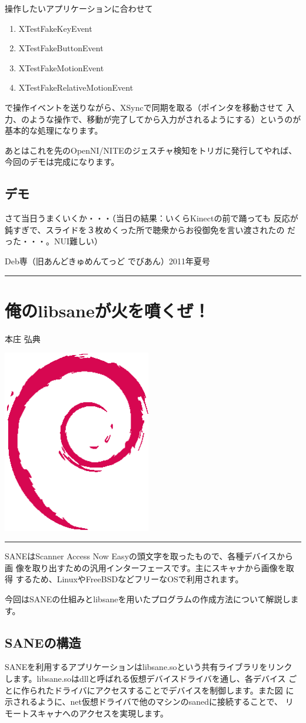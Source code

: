 \documentclass[mingoth,a4paper]{jsarticle}
\renewcommand{\dancersection}[2]{%
\newpage
Deb専（旧あんどきゅめんてっど でびあん）2011年夏号
%
\vspace{0.1mm}\\
{\color{dancerdarkblue}\rule{\hsize}{2mm}}

%
%
\begin{minipage}[t]{0.6\hsize}
\color{dancerdarkblue}
\vspace{1cm}
\section{#1}
\hfill{}#2\\
\end{minipage}
\begin{minipage}[t]{0.4\hsize}
\vspace{-2cm}
\hfill{}\includegraphics[height=8cm]{image200502/openlogo-nd.eps}\\
\vspace{-5cm}
\end{minipage}
%
{\color{dancerlightblue}\rule{0.66\hsize}{2mm}}
%
\vspace{2cm}
}
\begin{document}
操作したいアプリケーションに合わせて
\begin{enumerate}
\item XTestFakeKeyEvent
\item XTestFakeButtonEvent
\item XTestFakeMotionEvent
\item XTestFakeRelativeMotionEvent
\end{enumerate}
で操作イベントを送りながら、XSyncで同期を取る（ポインタを移動させて
入力、のような操作で、移動が完了してから入力がされるようにする）というのが
基本的な処理になります。

あとはこれを先のOpenNI/NITEのジェスチャ検知をトリガに発行してやれば、
今回のデモは完成になります。

\subsection{デモ}
さて当日うまくいくか・・・（当日の結果：いくらKinectの前で踊っても
反応が鈍すぎで、スライドを３枚めくった所で聴衆からお役御免を言い渡されたの
だった・・・。NUI難しい）

\dancersection{俺のlibsaneが火を噴くぜ！}{本庄 弘典}

SANEはScanner Access Now Easyの頭文字を取ったもので、各種デバイスから画
像を取り出すための汎用インターフェースです。主にスキャナから画像を取得
するため、LinuxやFreeBSDなどフリーなOSで利用されます。

今回はSANEの仕組みとlibsaneを用いたプログラムの作成方法について解説します。

\subsection{SANEの構造}

SANEを利用するアプリケーションはlibsane.soという共有ライブラリをリンク
します。libsane.soはdllと呼ばれる仮想デバイスドライバを通し、各デバイス
ごとに作られたドライバにアクセスすることでデバイスを制御します。また図
に示されるように、net仮想ドライバで他のマシンのsanedに接続することで、
リモートスキャナへのアクセスを実現します。
\cite{sane,sanejp,saneapi}
\end{document}
